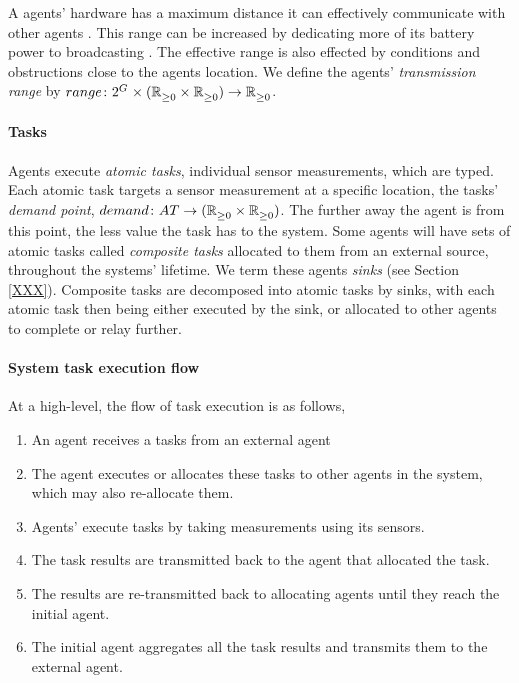 A agents' hardware has a maximum distance it can effectively communicate with other agents \cite{Radman201}. This range can be increased by dedicating more of its battery power to broadcasting \cite{Padmanabh2008, Song2009}. The effective range is also effected by conditions and obstructions close to the agents location. We define the agents' \textit{transmission range} by $\formalTransmissionRange{}{}$.  


\newcommand{\formalTaskDemandPoint}[2]{
	\functionFormal{demand}
	{\setAtomicTask  {}{}}{\tupleLocation{}{}}
}
\newcommand{\functionTaskDemandPoint}[2]{\functionSignature{demand}{\varAtomicTask{}{}}}
\paragraph{Tasks}
\label{section:task_and_resources:tasks}
Agents execute \textit{atomic tasks}, individual sensor measurements, which are typed. Each atomic task targets a sensor measurement at a specific location, the tasks' \textit{demand point}, $\formalTaskDemandPoint{}{}$. The further away the agent is from this point, the less value the task has to the system. Some agents will have sets of atomic tasks called \textit{composite tasks} allocated to them from an external source, throughout the systems' lifetime. We term these agents \textit{sinks} (see Section \ref{XXX}). Composite tasks are decomposed into atomic tasks by sinks, with each atomic task then being either executed by the sink, or allocated to other agents to complete or relay further.

\paragraph{System task execution flow}

At a high-level, the flow of task execution is as follows,
\begin{enumerate}
	\item An agent receives a tasks from an external agent
	\item The agent executes or allocates these tasks to other agents in the system, which may also re-allocate them.
	\item Agents' execute tasks by taking measurements using its sensors.
	\item The task results are transmitted back to the agent that allocated the task.
	\item The results are re-transmitted back to allocating agents until they reach the initial agent.
	\item The initial agent aggregates all the task results and transmits them to the external agent.
\end{enumerate}


